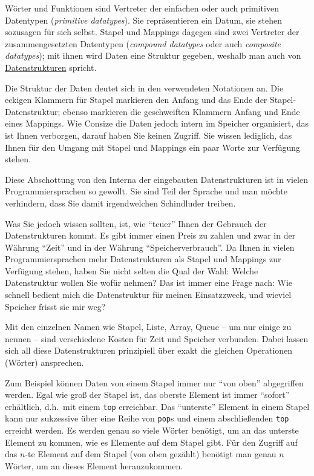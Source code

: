 Wörter und Funktionen sind Vertreter der einfachen oder auch primitiven Datentypen (\emph{primitive datatypes}). Sie repräsentieren ein Datum, sie stehen sozusagen für sich selbst. Stapel und Mappings dagegen sind zwei Vertreter der zusammengesetzten Datentypen (\emph{compound datatypes} oder auch \emph{composite datatypes}); mit ihnen wird Daten eine Struktur gegeben, weshalb man auch von \href{http://de.wikipedia.org/wiki/Datenstruktur}{Datenstrukturen} spricht.

Die Struktur der Daten deutet sich in den verwendeten Notationen an. Die eckigen Klammern für Stapel markieren den Anfang und das Ende der Stapel-Datenstruktur; ebenso markieren die geschweiften Klammern Anfang und Ende eines Mappings. Wie Consize die Daten jedoch intern im Speicher organisiert, das ist Ihnen verborgen, darauf haben Sie keinen Zugriff. Sie wissen lediglich, das Ihnen für den Umgang mit Stapel und Mappings ein paar Worte zur Verfügung stehen.

Diese Abschottung von den Interna der eingebauten Datenstrukturen ist in vielen Programmiersprachen so gewollt. Sie sind Teil der Sprache und man möchte verhindern, dass Sie damit irgendwelchen Schindluder treiben.

Was Sie jedoch wissen sollten, ist, wie "`teuer"' Ihnen der Gebrauch der Datenstrukturen kommt. Es gibt immer einen Preis zu zahlen und zwar in der Währung "`Zeit"' und in der Währung "`Speicherverbrauch"'. Da Ihnen in vielen Programmiersprachen mehr Datenstrukturen als Stapel und Mappings zur Verfügung stehen, haben Sie nicht selten die Qual der Wahl: Welche Datenstruktur wollen Sie wofür nehmen? Das ist immer eine Frage nach: Wie schnell bedient mich die Datenstruktur für meinen Einsatzzweck, und wieviel Speicher frisst sie mir weg?

Mit den einzelnen Namen wie Stapel, Liste, Array, Queue -- um nur einige zu nennen -- sind verschiedene Kosten für Zeit und Speicher verbunden. Dabei lassen sich all diese Datenstrukturen prinzipiell über exakt die gleichen Operationen (Wörter) ansprechen.

Zum Beispiel können Daten von einem Stapel immer nur "`von oben"' abgegriffen werden. Egal wie groß der Stapel ist, das oberste Element ist immer "`sofort"' erhältlich, d.h.\ mit einem \verb|top| erreichbar. Das "`unterste"' Element in einem Stapel kann nur sukzessive über eine Reihe von \verb|pop|s und einem abschließenden \verb|top| erreicht werden. Es werden genau so viele Wörter benötigt, um an das unterste Element zu kommen, wie es Elemente auf dem Stapel gibt. Für den Zugriff auf das $n$-te Element auf dem Stapel (von oben gezählt) benötigt man genau $n$ Wörter, um an dieses Element heranzukommen.

